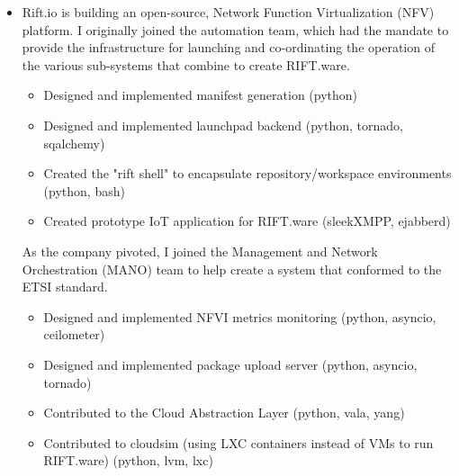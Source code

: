 \documentclass[11pt,a4paper,sans]{moderncv}        %
\begin{document}
\vspace{6pt}

\begin{itemize}

\item{}

  Rift.io is building an open-source, Network Function Virtualization (NFV)
  platform. I originally joined the automation team, which had the mandate to
  provide the infrastructure for launching and co-ordinating the operation of
  the various sub-systems that combine to create RIFT.ware.

  \begin{itemize}
    \item{Designed and implemented manifest generation (python)}
    \item{Designed and implemented launchpad backend (python, tornado, sqalchemy)}
    \item{Created the "rift shell" to encapsulate repository/workspace environments (python, bash)}
    \item{Created prototype IoT application for RIFT.ware (sleekXMPP, ejabberd)}
  \end{itemize}

  As the company pivoted, I joined the Management and Network Orchestration
  (MANO) team to help create a system that conformed to the ETSI standard.

  \begin{itemize}
    \item{Designed and implemented NFVI metrics monitoring (python, asyncio, ceilometer)}
    \item{Designed and implemented package upload server (python, asyncio, tornado)}
    \item{Contributed to the Cloud Abstraction Layer (python, vala, yang)}
    \item{Contributed to cloudsim (using LXC containers instead of VMs to run RIFT.ware) (python, lvm, lxc)}
  \end{itemize}

\end{itemize}


\vspace{6pt}
\end{document}
